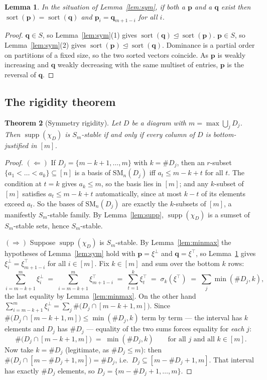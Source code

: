 \documentclass[11pt]{article}
\newtheorem{thm}{Theorem}[section]
\newtheorem{lem}[thm]{Lemma}
\theoremstyle{definition}
\DeclareMathOperator{\supp}{supp}
\DeclareMathOperator{\sort}{sort}
\newcommand{\SM}{\mathrm{SM}}
\begin{document}
\begin{lem}\label{lem:rev}
In the situation of Lemma~\ref{lem:sym}, if both a $\mathbf{p}$ and a $\mathbf{q}$ exist then
$\sort(\mathbf{p})=\sort(\mathbf{q})$ and $\mathbf{p}_i=\mathbf{q}_{m+1-i}$ for all $i$.
\end{lem}

\begin{proof}
$\mathbf{q}\in S$, so Lemma~\ref{lem:sym}(1) gives $\sort(\mathbf{q})\trianglelefteq
\sort(\mathbf{p})$. $\mathbf{p}\in S$, so Lemma~\ref{lem:sym}(2) gives
$\sort(\mathbf{p})\trianglelefteq\sort(\mathbf{q})$. Dominance is a partial order on partitions
of a fixed size, so the two sorted vectors coincide. As $\mathbf{p}$ is weakly increasing and
$\mathbf{q}$ weakly decreasing with the same multiset of entries, $\mathbf{p}$ is the reversal
of $\mathbf{q}$.
\end{proof}

\subsection{The rigidity theorem}

\begin{thm}[Symmetry rigidity]\label{thm:rigid}
Let $D$ be a diagram with $m=\max\bigcup_jD_j$. Then $\supp(\chi_D)$ is $S_m$-stable
\emph{if and only if} every column of $D$ is bottom-justified in $[m]$.
\end{thm}

\begin{proof}
$(\Leftarrow)$ If $D_j=\{m-k+1,\dots,m\}$ with $k=\#D_j$, then an $r$-subset
$\{a_1<\dots<a_k\}\subseteq[n]$ is a basis of $\SM_n(D_j)$ iff $a_t\le m-k+t$ for all $t$. The
condition at $t=k$ gives $a_k\le m$, so the basis lies in $[m]$; and any $k$-subset of $[m]$
satisfies $a_t\le m-k+t$ automatically, since at most $k-t$ of its elements exceed $a_t$. So
the bases of $\SM_n(D_j)$ are exactly the $k$-subsets of $[m]$, a manifestly $S_m$-stable
family. By Lemma~\ref{lem:supp}, $\supp(\chi_D)$ is a sumset of $S_m$-stable sets, hence
$S_m$-stable.

$(\Rightarrow)$ Suppose $\supp(\chi_D)$ is $S_m$-stable. By Lemma~\ref{lem:minmax} the
hypotheses of Lemma~\ref{lem:sym} hold with $\mathbf{p}=\xi^{\perp}$ and
$\mathbf{q}=\xi^{\top}$, so Lemma~\ref{lem:rev} gives
$\xi^{\perp}_i=\xi^{\top}_{m+1-i}$ for all $i\in[m]$. Fix $k\in[m]$ and sum over the bottom $k$
rows:
\[
  \sum_{i=m-k+1}^{m}\xi^{\perp}_i
  \;=\;\sum_{i=m-k+1}^{m}\xi^{\top}_{m+1-i}
  \;=\;\sum_{t=1}^{k}\xi^{\top}_t
  \;=\;\sigma_k(\xi^{\top})
  \;=\;\sum_{j}\min(\#D_j,k),
\]
the last equality by Lemma~\ref{lem:minmax}. On the other hand
$\sum_{i=m-k+1}^{m}\xi^{\perp}_i=\sum_j\#\bigl(D_j\cap[m-k+1,m]\bigr)$. Since
$\#\bigl(D_j\cap[m-k+1,m]\bigr)\le\min(\#D_j,k)$ term by term --- the interval has $k$ elements
and $D_j$ has $\#D_j$ --- equality of the two sums forces equality for \emph{each} $j$:
\[
  \#\bigl(D_j\cap[m-k+1,m]\bigr)\;=\;\min(\#D_j,k)\qquad\text{for all }j\text{ and all }k\in[m].
\]
Now take $k=\#D_j$ (legitimate, as $\#D_j\le m$): then $\#\bigl(D_j\cap[m-\#D_j+1,m]\bigr)=
\#D_j$, i.e.\ $D_j\subseteq[m-\#D_j+1,m]$. That interval has exactly $\#D_j$ elements, so
$D_j=\{m-\#D_j+1,\dots,m\}$.
\end{proof}
\end{document}
